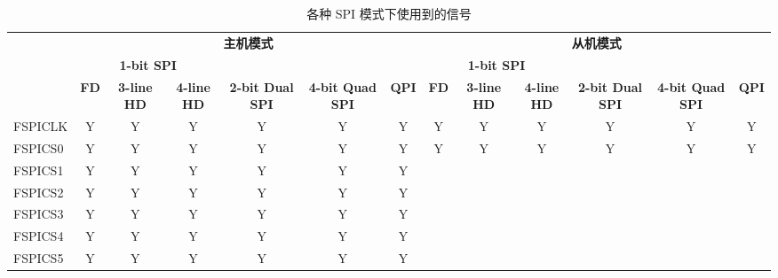 \documentclass[main\_\_CN.tex]{subfiles}
\begin{document}
\begin{landscape}
\begin{table}[H]
    \centering
    \caption{各种 SPI 模式下使用到的信号}
    \label{tab:pins-singals-used-in-various-spi-modes}

    \begin{threeparttable}
    \begin{tabular}{ |p{2.0cm} |c|c|c|c|c|c|c|c|c|c|c|c| }
    \hline
        \rowcolor{lightgray}
        & \multicolumn{6}{c|}{\textbf{主机模式}} & \multicolumn{6}{c|}{\textbf{从机模式}} \\\cline{2-13}
        \rowcolor{lightgray}
        & \multicolumn{3}{c|}{\textbf{1-bit SPI}} & & & & \multicolumn{3}{c|}{\textbf{1-bit SPI}} & & & \\ \cline{2-4} \cline{8-10}
        \rowcolor{lightgray}
        \multirow{-3}{*}{\textbf{FSPI 总线信号}} & \textbf{FD\tnote{1}} & \textbf{3-line HD\tnote{2}} & \textbf{4-line HD} & \multirow{-2}{*}{\textbf{2-bit Dual SPI}} & \multirow{-2}{*}{\textbf{4-bit Quad SPI}} & \multirow{-2}{*}{\textbf{QPI}} & \textbf{FD} & \textbf{3-line HD} & \textbf{4-line HD} & \multirow{-2}{*}{\textbf{2-bit Dual SPI}} & \multirow{-2}{*}{\textbf{4-bit Quad SPI}} & \multirow{-2}{*}{\textbf{QPI}} \\ \hline
FSPICLK                  & Y       & Y       & Y       & Y       & Y       & Y      & Y       & Y      & Y       & Y       & Y       & Y      \\ \hline
FSPICS0                  & Y       & Y       & Y       & Y       & Y       & Y      & Y       & Y      & Y       & Y       & Y       & Y      \\ \hline
FSPICS1                  & Y       & Y       & Y       & Y       & Y       & Y      &         &        &         &         &         &        \\ \hline
FSPICS2                  & Y       & Y       & Y       & Y       & Y       & Y      &         &        &         &         &         &        \\ \hline
FSPICS3                  & Y       & Y       & Y       & Y       & Y       & Y      &         &        &         &         &         &        \\ \hline
FSPICS4                  & Y       & Y       & Y       & Y       & Y       & Y      &         &        &         &         &         &        \\ \hline
FSPICS5                  & Y       & Y       & Y       & Y       & Y       & Y      &         &        &         &         &         &        \\ \hline

\end{tabular}
\end{threeparttable}
\end{table}
\end{landscape}
\end{document}
